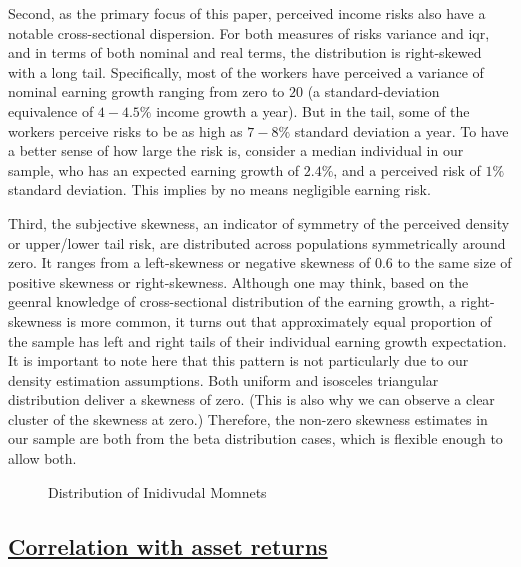 \documentclass[12pt,notitlepage,onecolumn,aps,pra]{revtex4-1}
\begin{document}
Second, as the primary focus of this paper, perceived income risks also
have a notable cross-sectional dispersion. For both measures of risks
variance and iqr, and in terms of both nominal and real terms, the
distribution is right-skewed with a long tail. Specifically, most of the
workers have perceived a variance of nominal earning growth ranging from
zero to \(20\) (a standard-deviation equivalence of \(4-4.5\%\) income
growth a year). But in the tail, some of the workers perceive risks to
be as high as \(7-8\%\) standard deviation a year. To have a better
sense of how large the risk is, consider a median individual in our
sample, who has an expected earning growth of \(2.4\%\), and a perceived
risk of \(1\%\) standard deviation. This implies by no means negligible
earning risk.

Third, the subjective skewness, an indicator of symmetry of the
perceived density or upper/lower tail risk, are distributed across
populations symmetrically around zero. It ranges from a left-skewness or
negative skewness of 0.6 to the same size of positive skewness or
right-skewness. Although one may think, based on the geenral knowledge
of cross-sectional distribution of the earning growth, a right-skewness
is more common, it turns out that approximately equal proportion of the
sample has left and right tails of their individual earning growth
expectation. It is important to note here that this pattern is not
particularly due to our density estimation assumptions. Both uniform and
isosceles triangular distribution deliver a skewness of zero. (This is
also why we can observe a clear cluster of the skewness at zero.)
Therefore, the non-zero skewness estimates in our sample are both from
the beta distribution cases, which is flexible enough to allow both.


    \begin{figure}
        \begin{center}\end{center}
        \caption{Distribution of Inidivudal Momnets}
        \label{fig:histmoms}
    \end{figure}
    
    \hypertarget{correlation-with-asset-returns}{%
\subsection{\texorpdfstring{\href{MacroRiskProfile.ipynb}{Correlation
with asset
returns}}{Correlation with asset returns}}\label{correlation-with-asset-returns}}
\end{document}
